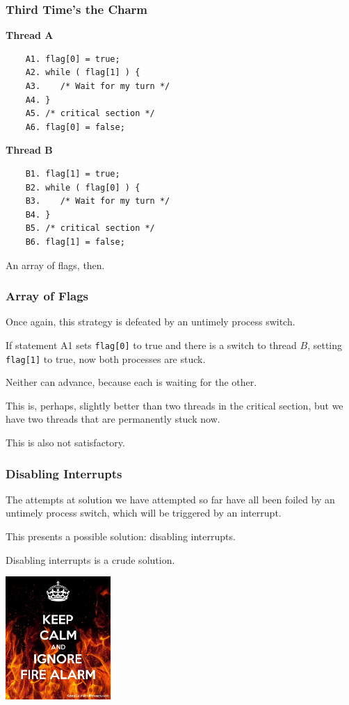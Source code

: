 \begin{frame}[fragile]
\frametitle{Third Time's the Charm}

\begin{multicols}{2}
\textbf{Thread A}
	\begin{verbatim}
	A1. flag[0] = true;
	A2. while ( flag[1] ) {
	A3.    /* Wait for my turn */
	A4. }
	A5. /* critical section */
	A6. flag[0] = false;
	\end{verbatim}
\columnbreak
\textbf{Thread B}
	\begin{verbatim}
	B1. flag[1] = true;
	B2. while ( flag[0] ) {
	B3.    /* Wait for my turn */
	B4. }
	B5. /* critical section */
	B6. flag[1] = false;
	\end{verbatim}
\end{multicols}

An array of flags, then.
\end{frame}

\begin{frame}
\frametitle{Array of Flags}

Once again, this strategy is defeated by an untimely process switch. 

If statement A1 sets \texttt{flag[0]} to true and there is a switch to thread $B$, setting \texttt{flag[1]} to true, now both processes are stuck.

Neither can advance, because each is waiting for the other.

This is, perhaps, slightly better than two threads in the critical section, but we have two threads that are permanently stuck now. 

This is also not satisfactory.

\end{frame}

\begin{frame}
\frametitle{Disabling Interrupts}

The attempts at solution we have attempted so far have all been foiled by an untimely process switch, which will be triggered by an interrupt. 

This presents a possible solution: disabling interrupts. 

Disabling interrupts is a crude solution. 

\begin{center}
	\includegraphics[width=0.3\textwidth]{images/ignorefirealarm.jpg}
\end{center}


\end{frame}

